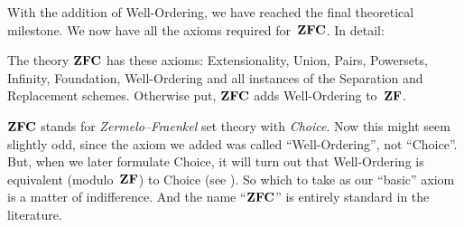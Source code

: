 \documentclass[../../../include/open-logic-section]{subfiles}
\begin{document}

With the addition of Well-Ordering, we have reached the final
theoretical milestone. We now have all the axioms required for~$\mathbf{ZFC}$.
In detail:

\begin{defn}
The theory $\mathbf{ZFC}$ has these axioms: Extensionality, Union, Pairs,
Powersets, Infinity, Foundation, Well-Ordering and all instances of
the Separation and Replacement schemes. Otherwise put, $\mathbf{ZFC}$ adds
Well-Ordering to~$\mathbf{ZF}$. 
\end{defn}

$\mathbf{ZFC}$ stands for \emph{Zermelo--Fraenkel} set theory with
\emph{Choice}. Now this might seem slightly odd, since the axiom we
added was called ``Well-Ordering'', not ``Choice''. But, when we later
formulate {Choice}, it will turn out that Well-Ordering is equivalent
(modulo~$\mathbf{ZF}$) to Choice (see ).
So which to take as our ``basic'' axiom is a matter of indifference.
And the name ``$\mathbf{ZFC}$'' is entirely standard in the literature. 
\end{document}
